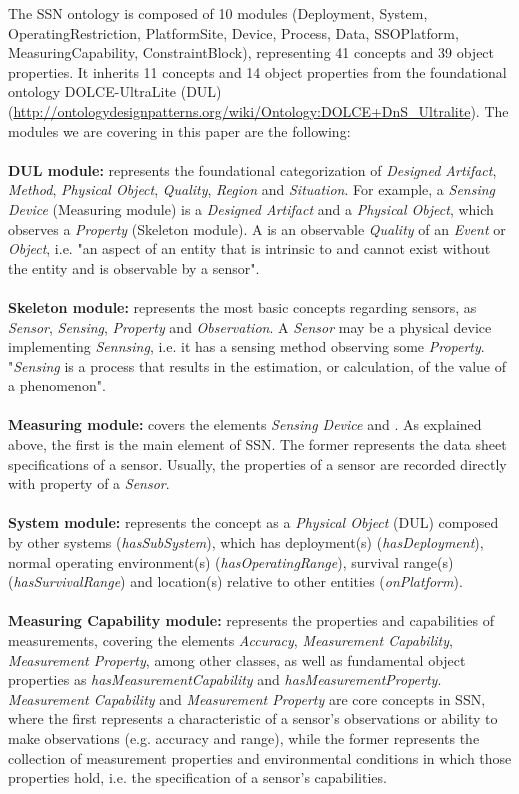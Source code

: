 \documentclass{sig-alternate-05-2015}
\begin{document}
The SSN ontology is composed of 10 modules (Deployment, System, OperatingRestriction, PlatformSite, Device, Process, Data, SSOPlatform, MeasuringCapability, ConstraintBlock), representing 41 concepts and 39 object properties. It inherits 11 concepts and 14 object properties from the foundational ontology DOLCE-UltraLite (DUL) (\url{http://ontologydesignpatterns.org/wiki/Ontology:DOLCE+DnS\_Ultralite}). The modules we are covering in this paper are the following:
\\\\\textbf{DUL module:} represents the foundational categorization of \textit{Designed Artifact}, \textit{Method}, \textit{Physical Object}, \textit{Quality}, \textit{Region} and \textit{Situation}. For example, a \textit{Sensing Device} (Measuring module) is a \textit{Designed Artifact} and a \textit{Physical Object}, which observes a \textit{Property} (Skeleton module). A  is an observable \textit{Quality} of an \textit{Event} or \textit{Object}, i.e. "an aspect of an entity that is intrinsic to and cannot exist without the entity and is observable by a sensor". 
\\\\\textbf{Skeleton module:} represents the most basic concepts regarding sensors, as \textit{Sensor}, \textit{Sensing}, \textit{Property} and  \textit{Observation}. A \textit{Sensor} may be a physical device implementing \textit{Sennsing}, i.e. it has a sensing method observing some \textit{Property}. "\textit{Sensing} is a process that results in the estimation, or calculation, of the value of a phenomenon". 
\\\\\textbf{Measuring module:} covers the elements \textit{Sensing Device} and . As explained above, the first is the main element of SSN. The former represents the data sheet specifications of a sensor. Usually, the properties of a sensor are recorded directly with  property of a \textit{Sensor}.
\\\\\textbf{System module:} represents the  concept as a \textit{Physical Object} (DUL) composed by other systems (\textit{hasSubSystem}), which has deployment(s) (\textit{hasDeployment}), normal operating environment(s) (\textit{hasOperatingRange}), survival range(s) (\textit{hasSurvivalRange}) and location(s) relative to other entities (\textit{onPlatform}).
\\\\\textbf{Measuring Capability module:} represents the properties and capabilities of measurements, covering the elements \textit{Accuracy}, \textit{Measurement Capability}, \textit{Measurement Property}, among other classes, as well as fundamental object properties as \textit{hasMeasurementCapability} and \textit{hasMeasurementProperty}. \textit{Measurement Capability} and \textit{Measurement Property} are core concepts in SSN, where the first represents a characteristic of a sensor's observations or ability to make observations (e.g. accuracy and range), while the former represents the collection of measurement properties and environmental conditions in which those properties hold, i.e. the specification of a sensor's capabilities. 
\end{document}
